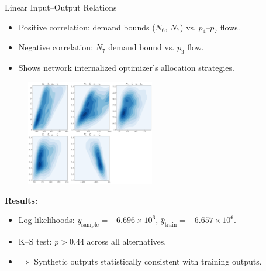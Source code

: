 \documentclass[hyperref={colorlinks,citecolor=blue,linkcolor=blue,urlcolor=blue}]{beamer}
\begin{document}
\begin{frame}{Linear Input--Output Relations}
\scriptsize
    \begin{itemize}
        \item Positive correlation: demand bounds ($N_6$, $N_7$) vs. $p_4$--$p_7$ flows.
        \item Negative correlation: $N_7$ demand bound vs. $p_3$ flow.
        \item Shows network internalized optimizer’s allocation strategies.
    \end{itemize}
    \begin{figure}
        \includegraphics[width=0.5\textwidth]{figures/inputs_outputs_2.png}
    \end{figure}
    \textbf{Results:}
    \begin{itemize}
        \item Log-likelihoods: $y_{\text{sample}} = -6.696 \times 10^6$, 
              $\bar{y}_{\text{train}} = -6.657 \times 10^6$.
        \item K–S test: $p > 0.44$ across all alternatives.
        \item $\Rightarrow$ Synthetic outputs statistically consistent with training outputs.
    \end{itemize}
%

\end{frame}
\end{document}
